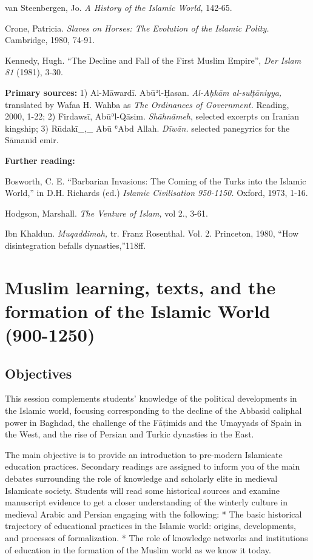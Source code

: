 \documentclass[
]{book}
\begin{document}
van Steenbergen, Jo. \emph{A History of the Islamic World,} 142-65.

Crone, Patricia. \emph{Slaves on Horses: The Evolution of the Islamic Polity.} Cambridge, 1980, 74-91.

Kennedy, Hugh. ``The Decline and Fall of the First Muslim Empire'', \emph{Der Islam 81} (1981), 3-30.

\textbf{Primary sources:} 1) Al-Māwardī. Abūʾl-Ḥasan. \emph{Al-Aḥkām al-sulṭāniyya,} translated by Wafaa H. Wahba as \emph{The Ordinances of Government.} Reading, 2000, 1-22; 2) Firdawsī, Abūʾl-Qāsim. \emph{Shāhnāmeh},
selected excerpts on Iranian kingship; 3) Rūdakī\_,\_ Abū ʿAbd Allah.
\emph{Dīwān.} selected panegyrics for the Sāmanīd emir.

\textbf{Further reading:}

Bosworth, C. E. ``Barbarian Invasions: The Coming of the Turks into the
Islamic World,'' in D.H. Richards (ed.) \emph{Islamic Civilisation 950-1150.}
Oxford, 1973, 1-16.

Hodgson, Marshall. \emph{The Venture of Islam,} vol 2., 3-61.

Ibn Khaldun. \emph{Muqaddimah,} tr. Franz Rosenthal. Vol. 2. Princeton, 1980,
``How disintegration befalls dynasties,''118ff.

\hypertarget{muslim-learning-texts-and-the-formation-of-the-islamic-world-900-1250}{%
\chapter{Muslim learning, texts, and the formation of the Islamic World (900-1250)}\label{muslim-learning-texts-and-the-formation-of-the-islamic-world-900-1250}}

\hypertarget{objectives}{%
\section{Objectives}\label{objectives}}

This session complements students' knowledge of the political developments in the Islamic world, focusing corresponding to the decline of the Abbasid caliphal power in Baghdad, the challenge of the Fāṭimids and the Umayyads of Spain in the West, and the rise of Persian and Turkic dynasties in the East.

The main objective is to provide an introduction to pre-modern Islamicate education practices. Secondary readings are assigned to inform you of the main debates surrounding the role of knowledge and scholarly elite in medieval Islamicate society. Students will read some historical sources and examine manuscript evidence to get a closer understanding of the winterly culture in medieval Arabic and Persian engaging with the following:
* The basic historical trajectory of educational practices in the Islamic world: origins, developments, and processes of formalization.
* The role of knowledge networks and institutions of education in the formation of the Muslim world as we know it today.
\end{document}
